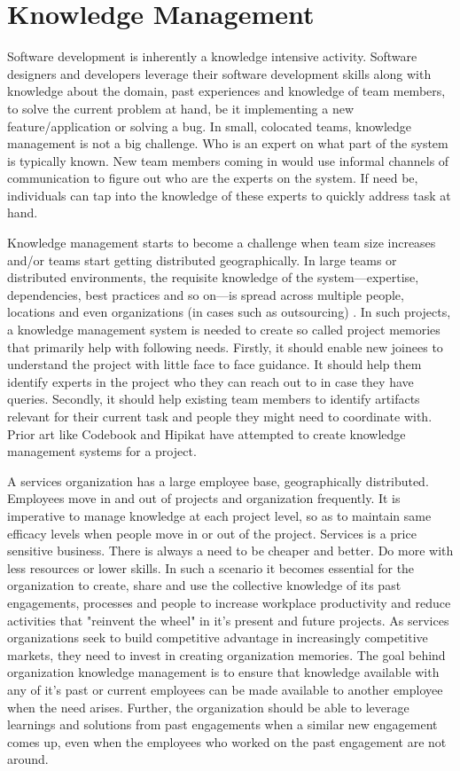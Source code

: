 
\section{Knowledge Management}
\label{sec:km}

Software development is inherently a knowledge intensive activity. Software designers and developers leverage their software development skills along with knowledge about the domain, past experiences and knowledge of team members, to solve the current problem at hand, be it implementing a new feature/application or solving a bug. 
In small, colocated teams, knowledge management is not a big challenge. Who is an expert on what part of the system is typically known. New team members coming in would use informal channels of communication to figure out who are the experts on the system. If need be, individuals can tap into the knowledge of these experts to quickly address task at hand. 

Knowledge management starts to become a challenge when team size increases and/or teams start getting distributed geographically. In large teams or distributed environments, the requisite knowledge of the system---expertise, dependencies, best practices and so on---is spread across multiple people, locations and even organizations (in cases such as outsourcing) \cite{Desouza:2006}. In such projects, a knowledge management system is needed to create so called project memories that primarily help with following needs. Firstly, it should enable new joinees to understand the project with little face to face guidance. It should help them identify experts in the project who they can reach out to in case they have queries. Secondly, it should help existing team members to identify artifacts relevant for their current task and people they might need to coordinate with. Prior art like Codebook \cite{} and Hipikat \cite{} have attempted to create knowledge management systems for a project. 

A services organization has a large employee base, geographically distributed. Employees move in and out of projects and organization frequently. It is imperative to manage knowledge at each project level, so as to maintain same efficacy levels when people move in or out of the project. 
Services is a price sensitive business. There is always a need to be cheaper and better. Do more with less resources or lower skills. In such a scenario it becomes essential for the organization to create, share and use the collective knowledge of its past engagements, processes and people to increase workplace productivity and reduce activities that "reinvent the wheel" in it's present and future projects. As services organizations seek to build competitive advantage in increasingly competitive markets, they need to invest in creating organization memories.
The goal behind organization knowledge management is to ensure that knowledge available with any of it's past or current employees can be made available to another employee when the need arises. Further, the organization should be able to leverage learnings and solutions from past engagements when a similar new engagement comes up, even when the employees who worked on the past engagement are not around.

